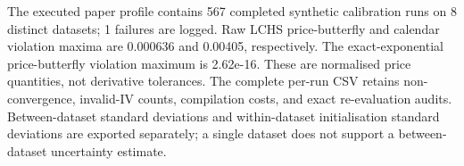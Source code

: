 The executed paper profile contains 567 completed synthetic calibration runs on 8 distinct datasets; 1 failures are logged. Raw LCHS price-butterfly and calendar violation maxima are 0.000636 and 0.00405, respectively. The exact-exponential price-butterfly violation maximum is 2.62e-16. These are normalised price quantities, not derivative tolerances. The complete per-run CSV retains non-convergence, invalid-IV counts, compilation costs, and exact re-evaluation audits. Between-dataset standard deviations and within-dataset initialisation standard deviations are exported separately; a single dataset does not support a between-dataset uncertainty estimate.
